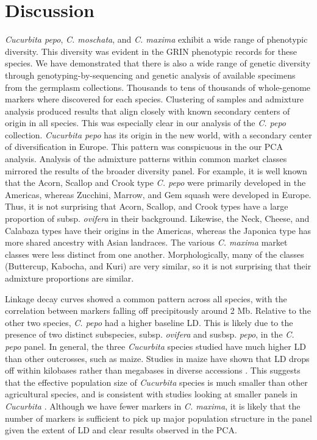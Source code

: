 \documentclass[utf8]{FrontiersinHarvard} %
\begin{document}
\section{Discussion}
\textit{Cucurbita pepo}, \textit{C. moschata}, and \textit{C. maxima} exhibit a wide range of phenotypic diversity. This diversity was evident in the GRIN phenotypic records for these species. We have demonstrated that there is also a wide range of genetic diversity through genotyping-by-sequencing and genetic analysis of available specimens from the germplasm collections. Thousands to tens of thousands of whole-genome markers where discovered for each species. Clustering of samples and admixture analysis produced results that align closely with known secondary centers of origin in all species. This was especially clear in our analysis of the \textit{C. pepo} collection. \textit{Cucurbita pepo} has its origin in the new world, with a secondary center of diversification in Europe. This pattern was conspicuous in the our PCA analysis. Analysis of the admixture patterns within common market classes mirrored the results of the broader diversity panel. For example, it is well known that the Acorn, Scallop and Crook type \textit{C. pepo} were primarily developed in the Americas, whereas Zucchini, Marrow, and Gem squash were developed in Europe. Thus, it is not surprising that Acorn, Scallop, and Crook types have a large proportion of subsp. \textit{ovifera} in their background. Likewise, the Neck, Cheese, and Calabaza types have their origins in the Americas, whereas the Japonica type has more shared ancestry with Asian landraces. The various \textit{C. maxima} market classes were less distinct from one another. Morphologically, many of the classes (Buttercup, Kabocha, and Kuri) are very similar, so it is not surprising that their admixture proportions are similar. 

Linkage decay curves showed a common pattern across all species, with the correlation between markers falling off precipitously around 2 Mb. Relative to the other two species, \textit{C. pepo} had a higher baseline LD. This is likely due to the presence of two distinct subspecies, subsp. \textit{ovifera} and susbsp. \textit{pepo}, in the \textit{C. pepo} panel. In general, the three \textit{Cucurbita} species studied have much higher LD than other outcrosses, such as maize. Studies in maize have shown that LD drops off within kilobases rather than megabases in diverse accessions \citep{Yan2009}. This suggests that the effective population size of \textit{Cucurbita} species is much smaller than other agricultural species, and is consistent with studies looking at smaller panels in \textit{Cucurbita} \citep{Xanthopoulou2019}. Although we have fewer markers in \textit{C. maxima}, it is likely that the number of markers is sufficient to pick up major population structure in the panel given the extent of LD and clear results observed in the PCA.
\end{document}
